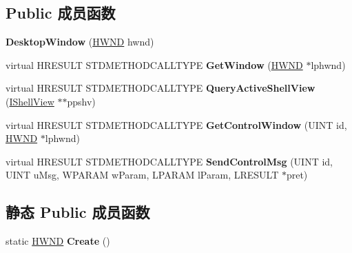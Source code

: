 \subsection*{Public 成员函数}
\begin{DoxyCompactItemize}
\item 
\mbox{\label{struct_desktop_window_a2e5a8af51511e72807dba75a91e9de20}} 
{\bfseries Desktop\+Window} (\hyperlink{interfacevoid}{H\+W\+ND} hwnd)
\item 
\mbox{\label{struct_desktop_window_a9d7fc516fcb483f2fbbba702c9afb02d}} 
virtual H\+R\+E\+S\+U\+LT S\+T\+D\+M\+E\+T\+H\+O\+D\+C\+A\+L\+L\+T\+Y\+PE {\bfseries Get\+Window} (\hyperlink{interfacevoid}{H\+W\+ND} $\ast$lphwnd)
\item 
\mbox{\label{struct_desktop_window_aafe2c308a9379e57c82e467c992a8e09}} 
virtual H\+R\+E\+S\+U\+LT S\+T\+D\+M\+E\+T\+H\+O\+D\+C\+A\+L\+L\+T\+Y\+PE {\bfseries Query\+Active\+Shell\+View} (\hyperlink{interface_i_shell_view}{I\+Shell\+View} $\ast$$\ast$ppshv)
\item 
\mbox{\label{struct_desktop_window_ae3e8fa5a731d0b13872e7aa0938a8d56}} 
virtual H\+R\+E\+S\+U\+LT S\+T\+D\+M\+E\+T\+H\+O\+D\+C\+A\+L\+L\+T\+Y\+PE {\bfseries Get\+Control\+Window} (U\+I\+NT id, \hyperlink{interfacevoid}{H\+W\+ND} $\ast$lphwnd)
\item 
\mbox{\label{struct_desktop_window_a09618322b934a6727692f21f78e5ecb8}} 
virtual H\+R\+E\+S\+U\+LT S\+T\+D\+M\+E\+T\+H\+O\+D\+C\+A\+L\+L\+T\+Y\+PE {\bfseries Send\+Control\+Msg} (U\+I\+NT id, U\+I\+NT u\+Msg, W\+P\+A\+R\+AM w\+Param, L\+P\+A\+R\+AM l\+Param, L\+R\+E\+S\+U\+LT $\ast$pret)
\end{DoxyCompactItemize}
\subsection*{静态 Public 成员函数}
\begin{DoxyCompactItemize}
\item 
\mbox{\label{struct_desktop_window_a1783bebfdae3fb6e121f6e661afee977}} 
static \hyperlink{interfacevoid}{H\+W\+ND} {\bfseries Create} ()
\end{DoxyCompactItemize}
